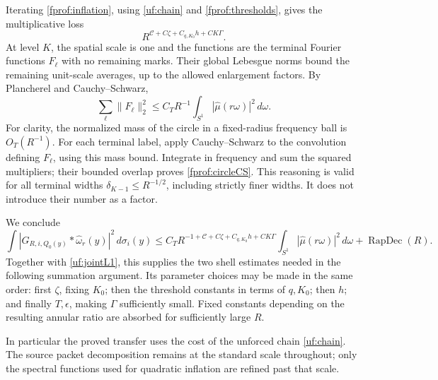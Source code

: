 Iterating \eqref{fprof:inflation}, using \eqref{uf:chain} and
\eqref{fprof:thresholds}, gives the multiplicative loss
$$
 R^{\mathcal C+C\zeta+C_{q,K_0}h+C K\Gamma}.
$$
At level \(K\), the spatial scale is one and the functions are the
terminal Fourier functions \(F_\ell\) with no remaining marks. Their
global Lebesgue norms bound the remaining unit-scale averages, up to
the allowed enlargement factors. By Plancherel and Cauchy--Schwarz,
\begin{equation}\label{fprof:circleCS}
 \sum_\ell\|F_\ell\|_2^2
 \leq C_T R^{-1}
       \int_{S^1}|\widehat\mu(r\omega)|^2\,d\omega.
\end{equation}
For clarity, the normalized mass of the circle in a fixed-radius
frequency ball is \(O_T(R^{-1})\). For each terminal label, apply
Cauchy--Schwarz to the convolution defining \(F_\ell\), using this
mass bound. Integrate in frequency and sum the squared multipliers;
their bounded overlap proves \eqref{fprof:circleCS}. This reasoning is
valid for all terminal widths \(\delta_{K-1}\leq R^{-1/2}\), including
strictly finer widths. It does not introduce their number as a factor.

We conclude
\begin{equation}\label{fprof:circleestimate}
 \int|G_{R,i,Q_0(y)}*\widehat\omega_r(y)|^2\,d\sigma_i(y)
 \leq C_T R^{-1+\mathcal C+C\zeta+C_{q,K_0}h+C K\Gamma}
       \int_{S^1}|\widehat\mu(r\omega)|^2\,d\omega
       +\operatorname{RapDec}(R).
\end{equation}
Together with \eqref{uf:jointL1}, this supplies the two shell estimates
needed in the following summation argument. Its parameter choices may
be made in the same order: first \(\zeta\), fixing \(K_0\); then the
threshold constants in terms of \(q,K_0\); then \(h\); and finally
\(T,\epsilon\), making \(\Gamma\) sufficiently small. Fixed constants
depending on the resulting annular ratio are absorbed for sufficiently
large \(R\).

In particular the proved transfer uses the cost of the unforced chain
\eqref{uf:chain}. The source packet decomposition remains at the
standard scale throughout; only the spectral functions used for
quadratic inflation are refined past that scale.
